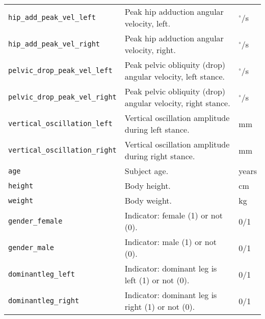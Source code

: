 {\begin{longtable}{@{}p{} p{} p{}@{}}
    \texttt{hip\_add\_peak\_vel\_left} & Peak hip adduction angular velocity, left. & $^\circ$/s \\
    \texttt{hip\_add\_peak\_vel\_right} & Peak hip adduction angular velocity, right. & $^\circ$/s \\
    \texttt{pelvic\_drop\_peak\_vel\_left} & Peak pelvic obliquity (drop) angular velocity, left stance. & $^\circ$/s \\
    \texttt{pelvic\_drop\_peak\_vel\_right} & Peak pelvic obliquity (drop) angular velocity, right stance. & $^\circ$/s \\
    \texttt{vertical\_oscillation\_left} & Vertical oscillation amplitude during left stance. & mm \\
    \texttt{vertical\_oscillation\_right} & Vertical oscillation amplitude during right stance. & mm \\
    \texttt{age} & Subject age. & years \\
    \texttt{height} & Body height. & cm \\
    \texttt{weight} & Body weight. & kg \\
    \texttt{gender\_female} & Indicator: female (1) or not (0). & 0/1 \\
    \texttt{gender\_male} & Indicator: male (1) or not (0). & 0/1 \\
    \texttt{dominantleg\_left} & Indicator: dominant leg is left (1) or not (0). & 0/1 \\
    \texttt{dominantleg\_right} & Indicator: dominant leg is right (1) or not (0). & 0/1 \\
\end{longtable}
}

